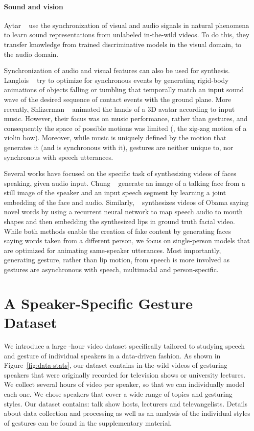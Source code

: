 \documentclass[10pt,twocolumn,letterpaper]{article}
\newcommand{\mypar}[1]{\vspace{-2mm}\paragraph{#1}}
\newcommand{\fig}[1]{Figure~\ref{#1}}
\begin{document}
\mypar{Sound and vision}
Aytar \etal~\cite{aytar2016soundnet} use the synchronization of visual and audio signals in natural phenomena to  learn sound representations from unlabeled in-the-wild videos. To do this, they transfer knowledge from trained discriminative models in the visual domain, to the audio domain. 

Synchronization of audio and visual features can also be used for synthesis. Langlois \etal~\cite{Langlois2014} try to optimize for synchronous events by generating rigid-body animations of objects falling or tumbling that temporally match an input sound wave of the desired sequence of contact events with the ground plane. More recently, Shlizerman \etal~\cite{shlizermanaudio} animated the hands of a 3D avatar according to input music. However, their focus was on music performance, rather than gestures, and consequently the space of possible motions was limited (\eg, the zig-zag motion of a violin bow). Moreover, while music is uniquely defined by the motion that generates it (and is synchronous with it), gestures are neither unique to, nor synchronous with speech utterances.

Several works have focused on the specific task of synthesizing videos of faces speaking, given audio input.
Chung \etal~\cite{Chung17b} generate an image of a talking face from a still image of the speaker and an input speech segment by learning a joint embedding of the face and audio. Similarly, ~\cite{Obama2017} synthesizes videos of Obama saying novel words by using a recurrent neural network to map speech audio to mouth shapes and then embedding the synthesized lips in ground truth facial video. While both methods enable the creation of fake content by generating faces saying words taken from a different person, we focus on single-person models that are optimized for animating same-speaker utterances. Most
importantly, generating gesture, rather than lip motion, from speech is more involved as gestures are asynchronous with speech, multimodal and person-specific.

\section{A Speaker-Specific Gesture Dataset}

\label{sec:data}
\newcommand{\dsetname}{Gestures\xspace}

We introduce a large -hour video dataset specifically tailored to studying speech and gesture of individual speakers in a data-driven fashion. As shown in \fig{fig:data-stats}, our dataset contains in-the-wild videos of  gesturing speakers that were originally recorded for television shows or university lectures. We collect several hours of video per speaker, so that we can individually model each one. We chose speakers that cover a wide range of topics and gesturing styles. Our dataset contains:  talk show hosts,  lecturers and  televangelists. Details about data collection and processing as well as an analysis of the individual styles of gestures can be found in the supplementary material.
\end{document}
